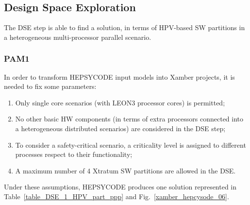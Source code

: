 \subsection{Design Space Exploration}
%
The DSE step is able to find a solution, in terms of HPV-based SW partitions in a heterogeneous multi-processor parallel scenario. 
%
\subsubsection{PAM1}
%
In order to transform HEPSYCODE input models into Xamber projects, it is needed to fix some parameters:
%
\begin{enumerate}
    \item Only single core scenarios (with LEON3 processor cores) is permitted; 
    \item No other basic HW components (in terms of extra processors connected into a heterogeneous distributed scenarios) are considered in the DSE step;
    \item To consider a safety-critical scenario, a criticality level is assigned to different processes respect to their functionality;
    \item A maximum number of 4 Xtratum SW partitions are allowed in the DSE.
\end{enumerate}
%
Under these assumptions, HEPSYCODE produces one solution represented in Table~\ref{table_DSE_1_HPV_part_ppp} and Fig.~\ref{xamber_hepcysode_06}.
%
\begin{table}[htbp]
\caption{Design Space Exploration with Hypervisor-based SW partitions.}
\begin{center}
\label{table_DSE_1_HPV_part_ppp}
\end{center}
\end{table}
